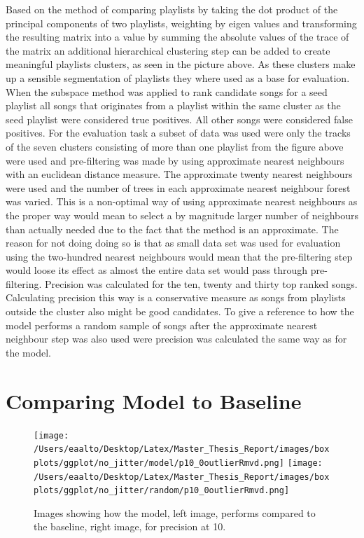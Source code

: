 \documentclass[a4paper,11pt]{kth-mag}
\begin{document}
Based on the method of comparing playlists by taking the dot product of the principal components of two playlists, weighting by eigen values and transforming the resulting matrix into a value by summing the absolute values of the trace of the matrix an additional hierarchical clustering step can be added to create meaningful playlists clusters, as seen in the picture above. As these clusters make up a sensible segmentation of playlists they where used as a base for evaluation. When the subspace method was applied to rank candidate songs for a seed playlist all songs that originates from a playlist within the same cluster as the seed playlist were considered true positives. All other songs were considered false positives. For the evaluation task a subset of data was used were only the tracks of the seven clusters consisting of more than one playlist from the figure above were used and pre-filtering was made by using approximate nearest neighbours with an euclidean distance measure. The approximate twenty nearest neighbours were used and the number of trees in each approximate nearest neighbour forest was varied. This is a non-optimal way of using approximate nearest neighbours as the proper way would mean to select a by magnitude larger number of neighbours than actually needed due to the fact that the method is an approximate. The reason for not doing doing so is that as small data set was used for evaluation using the two-hundred nearest neighbours would mean that the pre-filtering step would loose its effect as almost the entire data set would pass through pre-filtering. 
Precision was calculated for the ten, twenty and thirty top ranked songs. Calculating precision this way is a conservative measure as songs from playlists outside the cluster also might be good candidates. 
To give a reference to how the model performs a random sample of songs after the approximate nearest neighbour step was also used were precision was calculated the same way as for the model.

\section{Comparing Model to Baseline}

\begin{figure}
\texttt{[image: /Users/eaalto/Desktop/Latex/Master\_Thesis\_Report/images/boxplots/ggplot/no\_jitter/model/p10\_0outlierRmvd.png]}
\texttt{[image: /Users/eaalto/Desktop/Latex/Master\_Thesis\_Report/images/boxplots/ggplot/no\_jitter/random/p10\_0outlierRmvd.png]}

\caption{Images showing how the model, left image, performs compared to the baseline, right image, for precision at 10.}
\end{figure}
\end{document}
